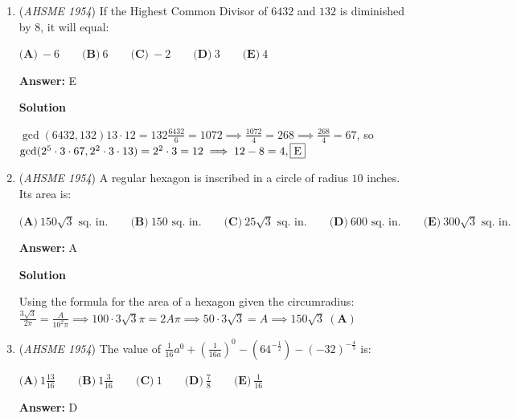 \begin{enumerate}
 \textbf{Answer: }C



\textbf{Solution}

$x=k\cdot y^3$, $y=j\cdot z^{\frac{1}{5}}\implies y^3=j^3\cdot z^{\frac{3}{5}}$, so $x=k\cdot j^3\cdot z^{\frac{3}{5}}$, $\fbox{C}$



	\item (\textit{AHSME 1954}) If the Highest Common Divisor of $6432$ and $132$ is diminished by $8$, it will equal: 


 $\textbf{(A)}\ -6 \qquad \textbf{(B)}\ 6 \qquad \textbf{(C)}\ -2 \qquad \textbf{(D)}\ 3 \qquad \textbf{(E)}\ 4$

 \textbf{Answer: }E



\textbf{Solution}

$\gcd(6432, 132)$$13\cdot 12=132$$\frac{6432}{6}=1072\implies\frac{1072}{4}=268\implies\frac{268}{4}=67$, so $\gcd(2^5\cdot 3\cdot 67, 2^2\cdot 3\cdot 13)=2^2\cdot 3=12\implies 12-8=4, \fbox{E}$



	\item (\textit{AHSME 1954}) A regular hexagon is inscribed in a circle of radius $10$ inches. Its area is: 


 $\textbf{(A)}\ 150\sqrt{3} \text{ sq. in.} \qquad \textbf{(B)}\ \text{150 sq. in.} \qquad \textbf{(C)}\ 25\sqrt{3}\text{ sq. in.}\qquad\textbf{(D)}\ \text{600 sq. in.}\qquad\textbf{(E)}\ 300\sqrt{3}\text{ sq. in.}$

 \textbf{Answer: }A



\textbf{Solution}

Using the formula for the area of a hexagon given the circumradius: $\frac{3\sqrt{3}}{2\pi}=\frac{A}{10^2\pi}\implies 100\cdot3\sqrt{3}\pi=2A\pi\implies 50\cdot3\sqrt{3}=A\implies 150\sqrt{3}\ \boxed{(\textbf{A})}$



	\item (\textit{AHSME 1954}) The value of $\frac{1}{16}a^0+\left (\frac{1}{16a} \right )^0- \left (64^{-\frac{1}{2}} \right )- (-32)^{-\frac{4}{5}}$ is: 


 $\textbf{(A)}\ 1 \frac{13}{16} \qquad \textbf{(B)}\ 1 \frac{3}{16} \qquad \textbf{(C)}\ 1 \qquad \textbf{(D)}\ \frac{7}{8}\qquad\textbf{(E)}\ \frac{1}{16}$

 \textbf{Answer: }D




\end{enumerate}
